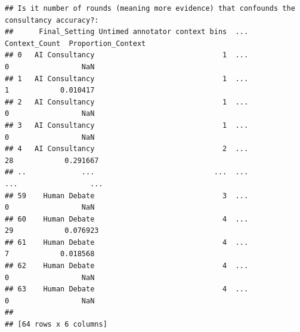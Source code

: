 \documentclass[
]{article}
\begin{document}
\begin{verbatim}
## Is it number of rounds (meaning more evidence) that confounds the consultancy accuracy?:
##      Final_Setting Untimed annotator context bins  ... Context_Count  Proportion_Context
## 0   AI Consultancy                              1  ...             0                 NaN
## 1   AI Consultancy                              1  ...             1            0.010417
## 2   AI Consultancy                              1  ...             0                 NaN
## 3   AI Consultancy                              1  ...             0                 NaN
## 4   AI Consultancy                              2  ...            28            0.291667
## ..             ...                            ...  ...           ...                 ...
## 59    Human Debate                              3  ...             0                 NaN
## 60    Human Debate                              4  ...            29            0.076923
## 61    Human Debate                              4  ...             7            0.018568
## 62    Human Debate                              4  ...             0                 NaN
## 63    Human Debate                              4  ...             0                 NaN
## 
## [64 rows x 6 columns]
\end{verbatim}
\end{document}
